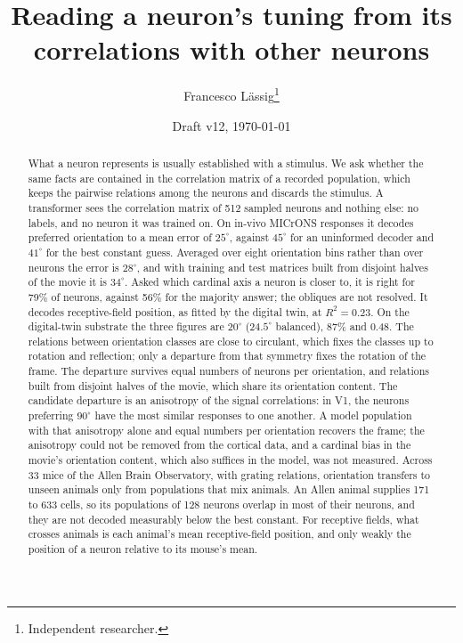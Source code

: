 \documentclass[11pt]{article}
\title{Reading a neuron's tuning from its correlations with other neurons}
\author{Francesco L\"assig\thanks{Independent researcher.}}
\date{Draft v12, \today}
\newcommand{\Rsq}{R^{2}}
\begin{document}
\maketitle

\begin{abstract}
What a neuron represents is usually established with a stimulus. We ask whether the same facts are contained in the correlation matrix of a recorded population, which keeps the pairwise relations among the neurons and discards the stimulus. A transformer sees the correlation matrix of 512 sampled neurons and nothing else: no labels, and no neuron it was trained on. On in-vivo MICrONS responses it decodes preferred orientation to a mean error of $25^\circ$, against $45^\circ$ for an uninformed decoder and $41^\circ$ for the best constant guess. Averaged over eight orientation bins rather than over neurons the error is $28^\circ$, and with training and test matrices built from disjoint halves of the movie it is $34^\circ$. Asked which cardinal axis a neuron is closer to, it is right for 79\% of neurons, against 56\% for the majority answer; the obliques are not resolved. It decodes receptive-field position, as fitted by the digital twin, at $\Rsq = 0.23$. On the digital-twin substrate the three figures are $20^\circ$ ($24.5^\circ$ balanced), 87\% and 0.48. The relations between orientation classes are close to circulant, which fixes the classes up to rotation and reflection; only a departure from that symmetry fixes the rotation of the frame. The departure survives equal numbers of neurons per orientation, and relations built from disjoint halves of the movie, which share its orientation content. The candidate departure is an anisotropy of the signal correlations: in V1, the neurons preferring $90^\circ$ have the most similar responses to one another. A model population with that anisotropy alone and equal numbers per orientation recovers the frame; the anisotropy could not be removed from the cortical data, and a cardinal bias in the movie's orientation content, which also suffices in the model, was not measured. Across 33 mice of the Allen Brain Observatory, with grating relations, orientation transfers to unseen animals only from populations that mix animals. An Allen animal supplies 171 to 633 cells, so its populations of 128 neurons overlap in most of their neurons, and they are not decoded measurably below the best constant. For receptive fields, what crosses animals is each animal's mean receptive-field position, and only weakly the position of a neuron relative to its mouse's mean.
\end{abstract}
\end{document}
